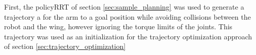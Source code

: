 \documentclass[../thesis.tex]{subfiles}
\begin{document}
First, the policyRRT of section \ref{sec:sample_planning} was used to generate a trajectory a for the arm to a goal position while avoiding collisions between the robot and the wing, however ignoring the torque limits of the joints.
This trajectory was used as an initialization for the trajectory optimization approach of section \ref{sec:trajectory_optimization}




\end{document}
